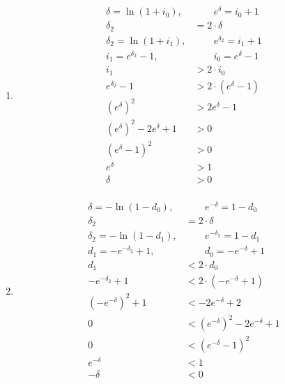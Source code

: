 \documentclass[a4paper, 12pt, reqno]{amsart}
\numberwithin{equation}{section}
\begin{document}
\begin{enumerate}[label=(\alph*)]
    \item \begin{equation}\nonumber
            \begin{aligned}
                \delta = \ln{(1+i_0)}, &\qquad e^{\delta} = i_0 + 1      \\
                \delta_2 &= 2 \cdot \delta                              \\
                \delta_2 = \ln{(1+i_1)}, &\qquad e^{\delta_2} = i_1 + 1  \\
                i_1 = e^{\delta_2} - 1, &\qquad i_0 = e^{\delta} - 1    \\
                i_1 &> 2 \cdot i_0       \\
                e^{\delta_2} - 1 &> 2 \cdot \left( e^{\delta} - 1 \right)   \\
                \left(e^{\delta}\right)^2 &> 2 e^{\delta} - 1               \\
                \left(e^{\delta}\right)^2 -2 e^{\delta} + 1 &> 0        \\
                \left(e^{\delta} - 1\right)^2 &> 0                      \\
                e^{\delta} &> 1                       \\
                \delta &> 0                      \\
            \end{aligned}
        \end{equation}
    \item \begin{equation}\nonumber
            \begin{aligned}
                \delta = -\ln{(1-d_0)}, &\qquad e^{-\delta} = 1 - d_0      \\
                \delta_2 &= 2 \cdot \delta                              \\
                \delta_2 = -\ln{(1-d_1)}, &\qquad e^{-\delta_2} = 1-d_1  \\
                d_1 = -e^{-\delta_2} + 1, &\qquad d_0 = -e^{-\delta} + 1    \\
                d_1 &< 2 \cdot d_0       \\
                -e^{-\delta_2} + 1 &< 2 \cdot \left( -e^{-\delta} + 1 \right)\\
                \left(-e^{-\delta}\right)^2 + 1 &< -2e^{-\delta} + 2 \\
                0 &< \left(e^{-\delta}\right)^2 -2e^{-\delta} + 1 \\
                0 &< \left(e^{-\delta} - 1\right)^2\\
                e^{-\delta} &< 1                       \\
                -\delta &< 0                      \\
            \end{aligned}
        \end{equation}
\end{enumerate}
\end{document}

